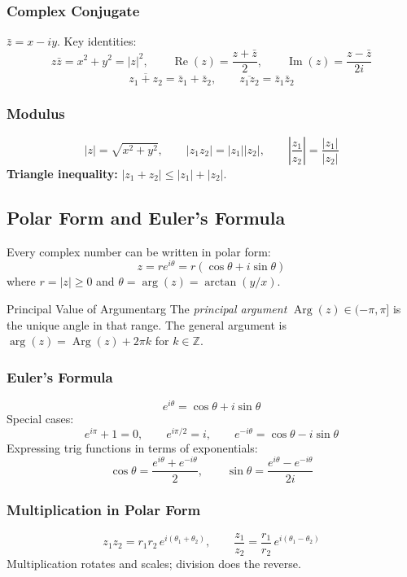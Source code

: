 \documentclass[11pt, letterpaper]{article}
\theoremstyle{plain}
\renewcommand{\Re}{\operatorname{Re}}
\renewcommand{\Im}{\operatorname{Im}}
\DeclareMathOperator{\Arg}{Arg}
\begin{document}
\subsubsection*{Complex Conjugate}
$\bar{z} = x - iy$. Key identities:
\[
    z\bar{z} = x^2 + y^2 = |z|^2, \qquad
    \Re(z) = \frac{z+\bar{z}}{2}, \qquad
    \Im(z) = \frac{z-\bar{z}}{2i}
\]
\[
    \overline{z_1 + z_2} = \bar{z}_1 + \bar{z}_2, \qquad
    \overline{z_1 z_2} = \bar{z}_1\bar{z}_2
\]

\subsubsection*{Modulus}
\[
    |z| = \sqrt{x^2 + y^2}, \qquad
    |z_1 z_2| = |z_1||z_2|, \qquad
    \left|\frac{z_1}{z_2}\right| = \frac{|z_1|}{|z_2|}
\]
\textbf{Triangle inequality:} $|z_1 + z_2| \leq |z_1| + |z_2|$.


\subsection{Polar Form and Euler's Formula}

Every complex number can be written in polar form:
\[
    z = r e^{i\theta} = r(\cos\theta + i\sin\theta)
\]
where $r = |z| \geq 0$ and $\theta = \arg(z) = \arctan(y/x)$.

\begin{definition}{Principal Value of Argument}{arg}
    The \emph{principal argument} $\Arg(z)\in(-\pi,\pi]$ is the unique
    angle in that range. The general argument is $\arg(z) = \Arg(z) + 2\pi k$
    for $k\in\mathbb{Z}$.
\end{definition}

\subsubsection*{Euler's Formula}
\[
    e^{i\theta} = \cos\theta + i\sin\theta
\]
Special cases:
\[
    e^{i\pi} + 1 = 0, \qquad e^{i\pi/2} = i, \qquad e^{-i\theta} = \cos\theta - i\sin\theta
\]
Expressing trig functions in terms of exponentials:
\[
    \cos\theta = \frac{e^{i\theta} + e^{-i\theta}}{2}, \qquad
    \sin\theta = \frac{e^{i\theta} - e^{-i\theta}}{2i}
\]

\subsubsection*{Multiplication in Polar Form}
\[
    z_1 z_2 = r_1 r_2\, e^{i(\theta_1+\theta_2)}, \qquad
    \frac{z_1}{z_2} = \frac{r_1}{r_2}\,e^{i(\theta_1 - \theta_2)}
\]
Multiplication rotates and scales; division does the reverse.
\end{document}

